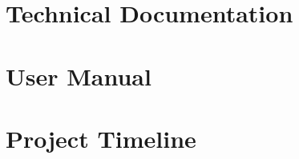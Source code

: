 \appendix
\renewcommand{\appendixname}{Appendix}

\chapter{Technical Documentation}

\chapter{User Manual}

\chapter{Project Timeline}

\cleardoublepage
\renewcommand{\bibname}{Bibliography}
\begin{thebibliography}{99}
\end{thebibliography} 